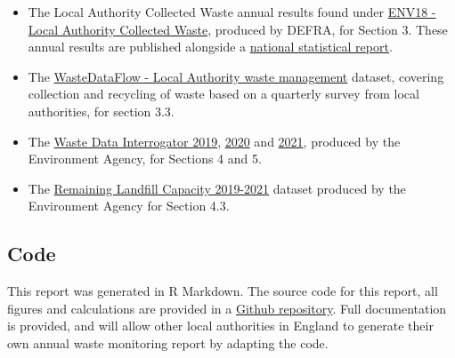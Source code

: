 \documentclass[
]{article}
\providecommand{\tightlist}{%
  \setlength{\itemsep}{0pt}\setlength{\parskip}{0pt}}
\begin{document}
\begin{itemize}
\tightlist
\item
  The Local Authority Collected Waste annual results found under
  \href{https://www.gov.uk/government/statistical-data-sets/env18-local-authority-collected-waste-annual-results-tables-202122}{ENV18
  - Local Authority Collected Waste}, produced by DEFRA, for Section 3.
  These annual results are published alongside a
  \href{https://www.gov.uk/government/statistics/local-authority-collected-waste-management-annual-results-202122/local-authority-collected-waste-management-annual-results-202122\#coronavirus-covid-19-the-impact-of-the-pandemic-on-local-authority-waste-collection-and-services}{national
  statistical report}.
\item
  The
  \href{https://www.data.gov.uk/dataset/0e0c12d8-24f6-461f-b4bc-f6d6a5bf2de5/wastedataflow-local-authority-waste-management}{WasteDataFlow
  - Local Authority waste management} dataset, covering collection and
  recycling of waste based on a quarterly survey from local authorities,
  for section 3.3.
\item
  The
  \href{https://find-data-beta.cloudapps.digital/dataset/d409b2ba-796c-4436-82c7-eb1831a9ef25/2019-waste-data-interrogator}{Waste
  Data Interrogator 2019},
  \href{https://www.data.gov.uk/dataset/bb40d091-a346-4b75-aa54-df7d347bed93/2020-waste-data-interrogator}{2020}
  and
  \href{https://www.data.gov.uk/dataset/d8a12b93-03ef-4fbf-9a43-1ca7a054479c/2021-waste-data-interrogator}{2021},
  produced by the Environment Agency, for Sections 4 and 5.
\item
  The
  \href{https://www.data.gov.uk/dataset/237825cb-dc10-4c53-8446-1bcd35614c12/remaining-landfill-capacity}{Remaining
  Landfill Capacity 2019-2021} dataset produced by the Environment
  Agency for Section 4.3.
\end{itemize}

\hypertarget{code}{%
\subsection{Code}\label{code}}

This report was generated in R Markdown. The source code for this
report, all figures and calculations are provided in a
\href{https://github.com/SCC-Planning/wamreport}{Github repository}.
Full documentation is provided, and will allow other local authorities
in England to generate their own annual waste monitoring report by
adapting the code.

\newpage
\end{document}
